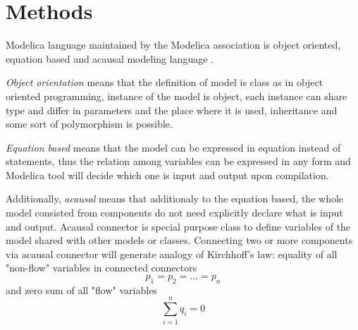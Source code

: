 \documentclass[letterpaper, 10 pt, conference]{ieeeconf}  %
\begin{document}





 

\section{Methods}


Modelica language maintained by the Modelica association is object oriented, equation based and acausal modeling language \cite{Modelica}.

\emph{Object orientation} means that the definition of model is class as in object oriented programming, instance of the model is object,  each instance can share type and differ in parameters and the place where it is used, inheritance and some sort of polymorphism is possible.

\emph{Equation based} means that the model can be expressed in equation instead of statements, thus the relation among variables can be expressed in any form and Modelica tool will decide which one is input and output upon compilation. %

Additionally, \emph{acausal} means that additionaly to the equation based, the whole model consisted from components do not need explicitly declare what is input and output. Acausal connector is special purpose class to define variables of the model shared with other models or classes. Connecting two or more components via acausal connector will generate analogy of Kirchhoff's law: equality of all "non-flow" variables in connected connectors \begin{equation}p_1=p_2=\ldots =p_n\label{eq:kirchhoff1}\end{equation}
and zero sum of all "flow" variables \begin{equation}\sum_{i=1}^n q_i=0\label{eq:kirchhoff2}\end{equation}
\end{document}
